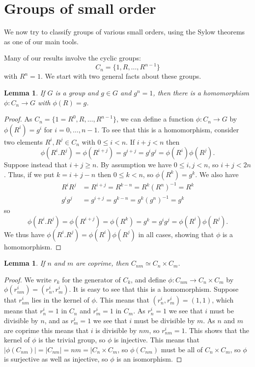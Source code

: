 \documentclass{amsart}
\newcommand{\tm}        {\times}
\newcommand{\xra}       {\xrightarrow}
\renewcommand{\:}{\colon}
\newtheorem{lemma}[theorem]{Lemma}
\theoremstyle{definition}
\begin{document}
\section{Groups of small order}

We now try to classify groups of various small orders, using the Sylow
theorems as one of our main tools.

Many of our results involve the cyclic groups:
\[ C_n = \{1,R,\ldots,R^{n-1}\} \]
with $R^n=1$.  We start with two general facts about these groups.
\begin{lemma}
 If $G$ is a group and $g\in G$ and $g^n=1$, then there is a
 homomorphism $\phi\:C_n\xra{}G$ with $\phi(R)=g$.
\end{lemma}
\begin{proof}
 As $C_n=\{1=R^0,R,\ldots,R^{n-1}\}$, we can define a function
 $\phi\:C_n\xra{}G$ by $\phi(R^i)=g^i$ for $i=0,\ldots,n-1$.  To see
 that this is a homomorphism, consider two elements $R^i,R^j\in C_n$
 with $0\leq i<n$.  If $i+j<n$ then 
 \[ \phi(R^i.R^j)=\phi(R^{i+j})=g^{i+j}=g^i g^j=\phi(R^i)\phi(R^j).
 \]
 Suppose instead that $i+j\geq n$.  By assumption we have
 $0\leq i,j<n$, so $i+j<2n$.  Thus, if we put $k=i+j-n$ then
 $0\leq k<n$, so $\phi(R^k)=g^k$.  We also have 
 \begin{align*}
  R^iR^j &= R^{i+j}=R^{k-n}=R^k(R^n)^{-1} = R^k \\ 
  g^ig^j &= g^{i+j}=g^{k-n}=g^k(g^n)^{-1} = g^k 
 \end{align*}
 so
 \[ \phi(R^i.R^j)=\phi(R^{i+j})=
     \phi(R^k)=g^k=g^ig^j=\phi(R^i)\phi(R^j). 
 \]
 We thus have $\phi(R^i.R^j)=\phi(R^i)\phi(R^j)$ in all cases, showing
 that $\phi$ is a homomorphism.
\end{proof}

\begin{lemma}\label{lem-cyclic-coprime}
 If $n$ and $m$ are coprime, then $C_{nm}\simeq C_n\tm C_m$.
\end{lemma}
\begin{proof}
 We write $r_k$ for the generator of $C_k$, and define
 $\phi\:C_{nm}\xra{}C_n\tm C_m$ by $\phi(r_{nm}^i)=(r_n^i,r_m^i)$.  It
 is easy to see that this is a homomorphism.  Suppose that $r_{nm}^i$
 lies in the kernel of $\phi$.  This means that $(r_n^i,r_m^i)=(1,1)$,
 which means that $r_n^i=1$ in $C_n$ and $r_m^i=1$ in $C_m$.  As
 $r_n^i=1$ we see that $i$ must be divisible by $n$, and as $r_m^i=1$
 we see that $i$ must be divisible by $m$.  As $n$ and $m$ are coprime
 this means that $i$ is divisible by $nm$, so $r_{nm}^i=1$.  This
 shows that the kernel of $\phi$ is the trivial group, so $\phi$ is
 injective.  This means that $|\phi(C_{nm})|=|C_{nm}|=nm=|C_n\tm C_m$,
 so $\phi(C_{nm})$ must be all of $C_n\tm C_m$, so $\phi$ is
 surjective as well as injective, so $\phi$ is an isomorphism.
\end{proof}
\end{document}
